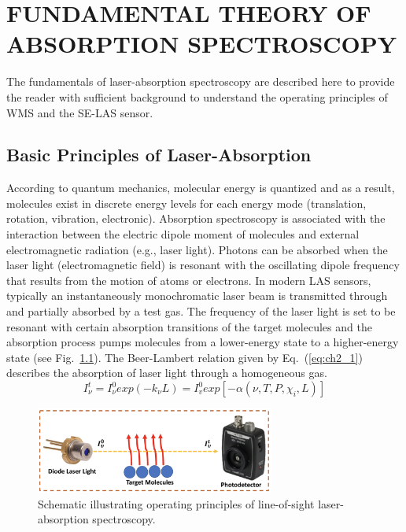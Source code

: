 \chapter{FUNDAMENTAL THEORY OF ABSORPTION SPECTROSCOPY}
The fundamentals of laser-absorption spectroscopy are described here to provide the reader with sufficient background to understand the operating principles of WMS and the SE-LAS sensor.

\section{Basic Principles of Laser-Absorption}
According to quantum mechanics, molecular energy is quantized and as a result, molecules exist in discrete energy levels for each energy mode (translation, rotation, vibration, electronic). Absorption spectroscopy is associated with the interaction between the electric dipole moment of molecules and external electromagnetic radiation (e.g., laser light).  Photons can be absorbed when the laser light (electromagnetic field) is resonant with the oscillating dipole frequency that results from the motion of atoms or electrons. In modern LAS sensors, typically an instantaneously monochromatic laser beam is transmitted through and partially absorbed by a test gas. The frequency of the laser light is set to be resonant with certain absorption transitions of the target molecules and the absorption process pumps molecules from a lower-energy state to a higher-energy state (see Fig.\ \ref{fig:ch2_1}). The Beer-Lambert relation given by Eq.\ (\ref{eq:ch2_1}) describes the absorption of laser light through a homogeneous gas.
\begin{equation}\label{eq:ch2_1}
I_\nu^t=I_\nu^0exp(-{k_\nu}L)=I_v^0exp[-\alpha(\nu,T,P,\chi_i,L)]
\end{equation}

\begin{figure}[ht]
    \centering
    \includegraphics[width=0.7\textwidth]{fig/ch2_fig1_v2.png}
    \singlespace\caption{Schematic illustrating operating principles of line-of-sight laser-absorption spectroscopy.}
    \label{fig:ch2_1}
\end{figure}

